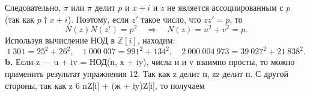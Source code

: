 \documentclass{mai_book}
\begin{document}
Сле­довательно, $\pi$ или $\pi$ делит $p$ и $x+i$ и $z$ не является ассоциированным\newpage
%
%
с $p$ (так как $p\dagger x+i$). Поэтому, если $z'$ такое число, что $zz'=p$, то\linebreak
$$N(z)N(z')=p^2\quad\Rightarrow\quad N(z)=u^2+v^2=p.$$
Используя вычисление НОД в $\mathbb{Z}[i]$, находим:
$$1~301=25^2+26^2,\quad1~000~037=991^2+134^2,\quad 2~000~004~973=39~027^2+21~838^2.$$
\hspace*{15pt}\textbf{b.} Если z — u + iv = НОД(п, х + iy), числа и и v взаимно просты,
то можно применить результат упражнения 12. Так как z делит п, zz
делит п. С другой стороны, так как z 6 nZ[i] + (ж + iy)Z[i], то получаем
\end{document}
